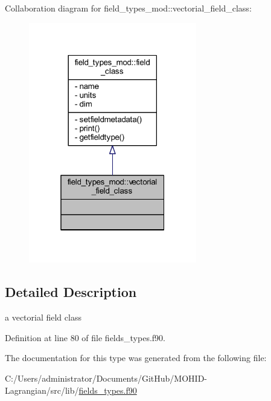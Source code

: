 Collaboration diagram for field\+\_\+types\+\_\+mod\+:\+:vectorial\+\_\+field\+\_\+class\+:\nopagebreak
\begin{figure}[H]
\begin{center}
\leavevmode
\includegraphics[width=208pt]{structfield__types__mod_1_1vectorial__field__class__coll__graph}
\end{center}
\end{figure}


\subsection{Detailed Description}
a vectorial field class 

Definition at line 80 of file fields\+\_\+types.\+f90.



The documentation for this type was generated from the following file\+:\begin{DoxyCompactItemize}
\item 
C\+:/\+Users/administrator/\+Documents/\+Git\+Hub/\+M\+O\+H\+I\+D-\/\+Lagrangian/src/lib/\mbox{\hyperlink{fields__types_8f90}{fields\+\_\+types.\+f90}}\end{DoxyCompactItemize}
